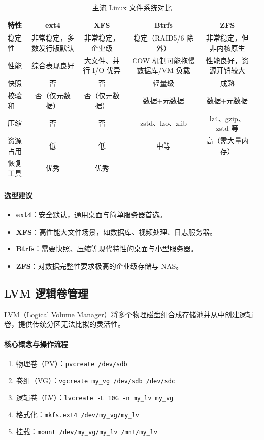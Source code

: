 \documentclass[12pt,UTF8]{ctexbook}
\begin{document}
\begin{table}[htbp]
	\centering
	\caption{主流 Linux 文件系统对比}
	\begin{tabular}{@{}lccccc@{}}
		\toprule
		\textbf{特性} & \textbf{ext4} & \textbf{XFS} & \textbf{Btrfs} & \textbf{ZFS} \\
		\midrule
		稳定性 & 非常稳定，多数发行版默认 & 非常稳定，企业级 & 稳定（RAID5/6 除外） & 非常稳定，但非内核原生 \\
		性能 & 综合表现良好 & 大文件、并行 I/O 优异 & COW 机制可能拖慢数据库/VM 负载 & 性能良好，资源开销较大 \\
		快照 & 否 & 否 & 轻量级 & 成熟 \\
		校验和 & 否（仅元数据） & 否（仅元数据） & 数据+元数据 & 数据+元数据 \\
		压缩 & 否 & 否 & zstd、lzo、zlib & lz4、gzip、zstd 等 \\
		资源占用 & 低 & 低 & 中等 & 高（需大量内存） \\
		恢复工具 & 优秀 & 优秀 & --- & --- \\
		\bottomrule
	\end{tabular}
\end{table}

\paragraph{选型建议}
\begin{itemize}
	\item \textbf{ext4}：安全默认，通用桌面与简单服务器首选。
	\item \textbf{XFS}：高性能大文件场景，如数据库、视频处理、日志服务器。
	\item \textbf{Btrfs}：需要快照、压缩等现代特性的桌面与小型服务器。
	\item \textbf{ZFS}：对数据完整性要求极高的企业级存储与 NAS。
\end{itemize}

\subsection{LVM 逻辑卷管理}

LVM（Logical Volume Manager）将多个物理磁盘组合成存储池并从中创建逻辑卷，提供传统分区无法比拟的灵活性。

\paragraph{核心概念与操作流程}
\begin{enumerate}
	\item 物理卷（PV）：\verb|pvcreate /dev/sdb|
	\item 卷组（VG）：\verb|vgcreate my_vg /dev/sdb /dev/sdc|
	\item 逻辑卷（LV）：\verb|lvcreate -L 10G -n my_lv my_vg|
	\item 格式化：\verb|mkfs.ext4 /dev/my_vg/my_lv|
	\item 挂载：\verb|mount /dev/my_vg/my_lv /mnt/my_lv|
\end{enumerate}
\end{document}
